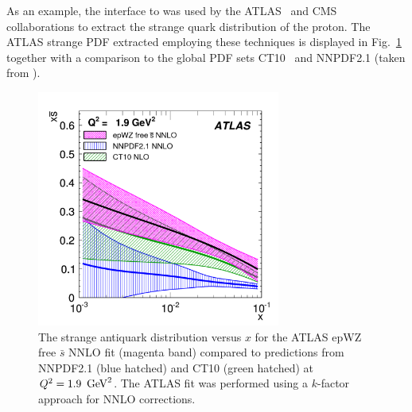 \begin{itemize}
    As an example, the \fitter interface to \applgrid was used by the ATLAS~\cite{atlas:strange}
    and CMS~\cite{cms:strange} collaborations to extract the strange quark distribution of the proton.
    The ATLAS strange PDF extracted employing these techniques is displayed in
    Fig.~\ref{fig:atlas} together with a comparison to the global PDF
    sets CT10~\cite{CT10pdf} and NNPDF2.1 \cite{NNPDFpdf} (taken from \cite{atlas:strange}).

\begin{figure}[!ht]
  \centering
  \includegraphics[width=8cm]{atlas.pdf}
  \caption{The strange antiquark distribution versus $x$ for the ATLAS
    epWZ free $\bar s$ NNLO fit \cite{atlas:strange} (magenta band) compared to predictions
    from NNPDF2.1 (blue hatched) and CT10 (green hatched) 
    at $Q^2 = 1.9\ \GeV^2$. The ATLAS fit was performed using a $k$-factor approach 
    for NNLO corrections.}
  \label{fig:atlas}
\end{figure}

\end{itemize}


